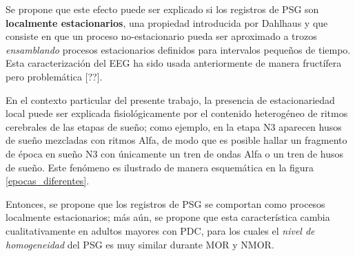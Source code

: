 Se propone que este efecto puede ser explicado si los registros de PSG son \textbf{localmente
estacionarios}, una propiedad introducida por Dahlhaus \cite{Dahlhaus97} y que consiste en que un
proceso no-estacionario pueda ser aproximado a trozos \textit{ensamblando} procesos estacionarios
definidos para intervalos pequeños de tiempo.
Esta caracterización del EEG ha sido usada anteriormente de manera fructífera pero problemática
[??].

En el contexto particular del presente trabajo, la presencia de estacionariedad local puede ser
explicada fisiológicamente por el contenido heterogéneo de ritmos cerebrales de las etapas de 
sueño; como ejemplo, en la etapa N3 aparecen husos de sueño mezcladas con ritmos Alfa, de modo
que es posible hallar un fragmento de época en sueño N3 con únicamente un tren de ondas Alfa
o un tren de husos de sueño.
Este fenómeno es ilustrado de manera esquemática en la figura \ref{epocas_diferentes}.



Entonces, se propone que los registros de PSG se comportan como procesos localmente estacionarios; 
más aún, se propone que esta característica cambia cualitativamente en adultos mayores con PDC,
para los cuales el \textit{nivel de homogeneidad} del PSG es muy similar durante MOR y NMOR.


